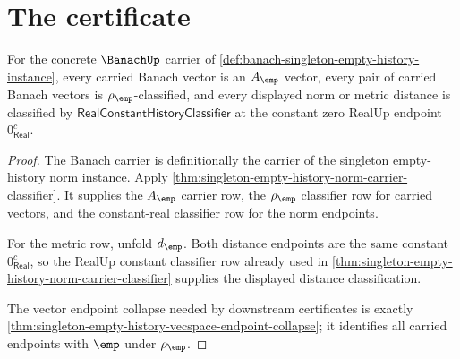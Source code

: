 \section{The certificate}
\label{sec:banach-certificate}

\begin{theorem}
\label{thm:banach-singleton-empty-history-carrier-classifier}
For the concrete $\BanachUp$ carrier of
\autoref{def:banach-singleton-empty-history-instance}, every carried Banach
vector is an $A_{\emp}$ vector, every pair of carried Banach vectors is
$\rho_{\emp}$-classified, and every displayed norm or metric distance is
classified by $\mathsf{RealConstantHistoryClassifier}$ at the constant zero
RealUp endpoint $0_{\mathsf{Real}}^{c}$.
\end{theorem}
\begin{proof}
The Banach carrier is definitionally the carrier of the singleton
empty-history norm instance. Apply
\autoref{thm:singleton-empty-history-norm-carrier-classifier}. It supplies the
$A_{\emp}$ carrier row, the $\rho_{\emp}$ classifier row for carried vectors,
and the constant-real classifier row for the norm endpoints.

For the metric row, unfold $d_{\emp}$. Both distance endpoints are the same
constant $0_{\mathsf{Real}}^{c}$, so the RealUp constant classifier row
already used in
\autoref{thm:singleton-empty-history-norm-carrier-classifier} supplies the
displayed distance classification.

The vector endpoint collapse needed by downstream certificates is exactly
\autoref{thm:singleton-empty-history-vecspace-endpoint-collapse}; it identifies
all carried endpoints with $\emp$ under $\rho_{\emp}$.
\end{proof}

